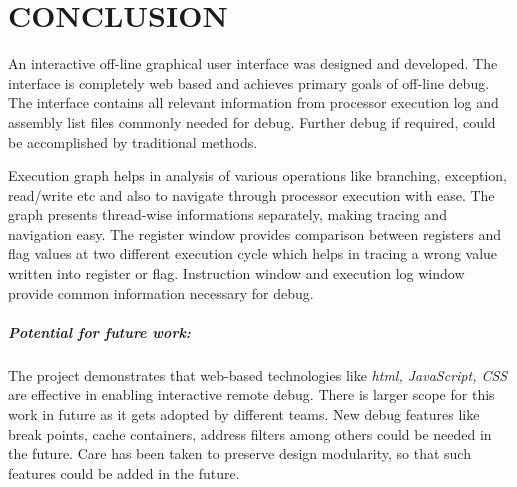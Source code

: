 \chapter{CONCLUSION}
\label{chap:GUI_conclusion}

An interactive off-line graphical user interface was designed and developed. The interface is completely web based and achieves primary goals of off-line debug. The interface contains all relevant information from processor execution log and assembly list files commonly needed for debug. Further debug if required, could be accomplished by traditional methods.

Execution graph helps in analysis of various operations like branching, exception, read/write etc and also to navigate through processor execution with ease. The graph presents thread-wise informations separately, making tracing and navigation easy. The register window provides comparison between registers and flag values at two different execution cycle which helps in tracing a wrong value written into register or flag. Instruction window and execution log window provide common information necessary for debug.

\paragraph{Potential for future work:} The project demonstrates that web-based technologies like {\it html, JavaScript, CSS} are effective in enabling interactive remote debug. There is larger scope for this work in future as it gets adopted by different teams. New debug features like break points, cache containers, address filters among others could be needed in the future. Care has been taken to preserve design modularity, so that such features could  be added in the future.

